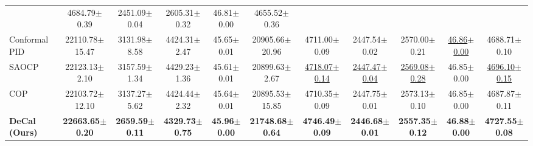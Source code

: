 \documentclass[sigplan,10pt, anonymous]{acmart}
\begin{document}
\begin{table}[t]
{\begin{tabular}{lcccccccccc}
                          & 4684.79{\scriptsize$\pm$0.39}   & 2451.09{\scriptsize$\pm$0.04}  & 2605.31{\scriptsize$\pm$0.32}  & 46.81{\scriptsize$\pm$0.00} & 4655.52{\scriptsize$\pm$0.36} \\
            Conformal PID & 22110.78{\scriptsize$\pm$15.47} & 3131.98{\scriptsize$\pm$8.58}  & 4424.31{\scriptsize$\pm$2.47}  & 45.65{\scriptsize$\pm$0.01} & 20905.66{\scriptsize$\pm$20.96} 
                          & 4711.00{\scriptsize$\pm$0.09}   & 2447.54{\scriptsize$\pm$0.02}  & 2570.00{\scriptsize$\pm$0.21}  & \underline{46.86{\scriptsize$\pm$0.00}} & 4688.71{\scriptsize$\pm$0.10} \\
            SAOCP         & 22123.13{\scriptsize$\pm$2.10}  & 3157.59{\scriptsize$\pm$1.34}  & 4429.23{\scriptsize$\pm$1.36}  & 45.61{\scriptsize$\pm$0.01} & 20899.63{\scriptsize$\pm$2.67}  
                          & \underline{4718.07{\scriptsize$\pm$0.14}} & \underline{2447.47{\scriptsize$\pm$0.04}} & \underline{2569.08{\scriptsize$\pm$0.28}} & 46.85{\scriptsize$\pm$0.00} & \underline{4696.10{\scriptsize$\pm$0.15}} \\
            COP           & 22103.72{\scriptsize$\pm$12.10} & 3137.27{\scriptsize$\pm$5.62}  & 4424.44{\scriptsize$\pm$2.32}  & 45.64{\scriptsize$\pm$0.01} & 20895.53{\scriptsize$\pm$15.85} 
                          & 4710.35{\scriptsize$\pm$0.09}   & 2447.75{\scriptsize$\pm$0.01}  & 2573.13{\scriptsize$\pm$0.10}  & 46.85{\scriptsize$\pm$0.00} & 4687.87{\scriptsize$\pm$0.11} \\
            \midrule
            \textbf{DeCal (Ours)} 
                          & \textbf{22663.65{\scriptsize$\pm$0.20}} & \textbf{2659.59{\scriptsize$\pm$0.11}} & \textbf{4329.73{\scriptsize$\pm$0.75}} & \textbf{45.96{\scriptsize$\pm$0.00}} & \textbf{21748.68{\scriptsize$\pm$0.64}} 
                          & \textbf{4746.49{\scriptsize$\pm$0.09}} & \textbf{2446.68{\scriptsize$\pm$0.01}} & \textbf{2557.35{\scriptsize$\pm$0.12}} & \textbf{46.88{\scriptsize$\pm$0.00}} & \textbf{4727.55{\scriptsize$\pm$0.08}} \\
            \bottomrule
        \end{tabular}
    }
\end{table}
\end{document}
